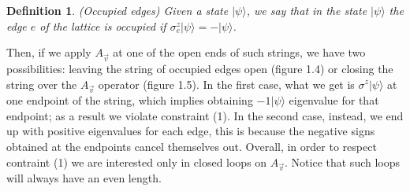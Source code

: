 \documentclass{Configuration_Files/PoliMi3i_thesis}
\newtheorem{definition}{Definition}[chapter]
\begin{document}
\begin{definition}(Occupied edges)
	Given a state $|\psi\rangle $, we say that in the state $|\psi\rangle $ the edge $e$ of the lattice is occupied if $\sigma^z_e |\psi\rangle  = - |\psi\rangle $.
\end{definition}

Then, if we apply $A_{\vec{v}} $ at one of the open ends of such strings, we have two possibilities: leaving the string of occupied edges open (figure 1.4) or closing the string over the $A_{\vec{v}} $ operator (figure 1.5).
In the first case, what we get is $\sigma^{z} |\psi\rangle$ at one endpoint of the string, which implies obtaining $-1|\psi\rangle$ eigenvalue for that endpoint; as a result we violate constraint (1). In the second case, instead, we end up with positive eigenvalues for each edge, this is because the negative signs obtained at the endpoints cancel themselves out. Overall, in order to respect contraint (1) we are interested only in closed loops on $A_{\vec{v}} $. Notice that such loops will always have an even length.{\cite{Her20}}
\end{document}
